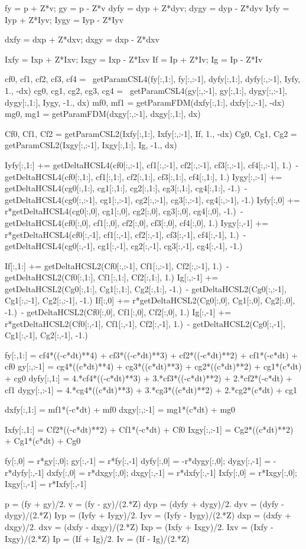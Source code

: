 \documentclass[dvipdfmx, 9pt, a4paper]{jsarticle}
\begin{document}
\begin{python}
	fy = p + Z*v; gy = p - Z*v
	dyfy = dyp + Z*dyv; dygy = dyp - Z*dyv
	Iyfy = Iyp + Z*Iyv; Iygy = Iyp - Z*Iyv

	dxfy = dxp + Z*dxv; dxgy = dxp - Z*dxv

	Ixfy = Ixp + Z*Ixv; Ixgy = Ixp - Z*Ixv
	If = Ip + Z*Iv; Ig = Ip - Z*Iv

	cf0, cf1, cf2, cf3, cf4 = \
	getParamCSL4(fy[:,1:], fy[:,:-1], dyfy[:,1:], dyfy[:,:-1], Iyfy, 1., -dx)
	cg0, cg1, cg2, cg3, cg4 = \
	getParamCSL4(gy[:,:-1], gy[:,1:], dygy[:,:-1], dygy[:,1:], Iygy, -1., dx)
	mf0, mf1 = getParamFDM(dxfy[:,1:], dxfy[:,:-1], -dx)
	mg0, mg1 = getParamFDM(dxgy[:,:-1], dxgy[:,1:], dx)

	Cf0, Cf1, Cf2 = getParamCSL2(Ixfy[:,1:], Ixfy[:,:-1], If, 1., -dx)
	Cg0, Cg1, Cg2 = getParamCSL2(Ixgy[:,:-1], Ixgy[:,1:], Ig, -1., dx)

	Iyfy[:,1:] += getDeltaHCSL4(cf0[:,:-1], cf1[:,:-1], cf2[:,:-1], cf3[:,:-1], cf4[:,:-1], 1.)\
	 - getDeltaHCSL4(cf0[:,1:], cf1[:,1:], cf2[:,1:], cf3[:,1:], cf4[:,1:], 1.)
	Iygy[:,:-1] += getDeltaHCSL4(cg0[:,1:], cg1[:,1:], cg2[:,1:], cg3[:,1:], cg4[:,1:], -1.)\
	 - getDeltaHCSL4(cg0[:,:-1], cg1[:,:-1], cg2[:,:-1], cg3[:,:-1], cg4[:,:-1], -1.)
	Iyfy[:,0] += r*getDeltaHCSL4(cg0[:,0], cg1[:,0], cg2[:,0], cg3[:,0], cg4[:,0], -1.)\
	 - getDeltaHCSL4(cf0[:,0], cf1[:,0], cf2[:,0], cf3[:,0], cf4[:,0], 1.)
	Iygy[:,-1] += r*getDeltaHCSL4(cf0[:,-1], cf1[:,-1], cf2[:,-1], cf3[:,-1], cf4[:,-1], 1.)\
	 - getDeltaHCSL4(cg0[:,-1], cg1[:,-1], cg2[:,-1], cg3[:,-1], cg4[:,-1], -1.)

	If[:,1:] += getDeltaHCSL2(Cf0[:,:-1], Cf1[:,:-1], Cf2[:,:-1], 1.)\
	 - getDeltaHCSL2(Cf0[:,1:], Cf1[:,1:], Cf2[:,1:], 1.)
	Ig[:,:-1] += getDeltaHCSL2(Cg0[:,1:], Cg1[:,1:], Cg2[:,1:], -1.)\
	 - getDeltaHCSL2(Cg0[:,:-1], Cg1[:,:-1], Cg2[:,:-1], -1.)
	If[:,0] += r*getDeltaHCSL2(Cg0[:,0], Cg1[:,0], Cg2[:,0], -1.)\
	 - getDeltaHCSL2(Cf0[:,0], Cf1[:,0], Cf2[:,0], 1.)
	Ig[:,-1] += r*getDeltaHCSL2(Cf0[:,-1], Cf1[:,-1], Cf2[:,-1], 1.)\
	 - getDeltaHCSL2(Cg0[:,-1], Cg1[:,-1], Cg2[:,-1], -1.)

	fy[:,1:] = cf4*((-c*dt)**4) + cf3*((-c*dt)**3) + cf2*((-c*dt)**2) + cf1*(-c*dt) + cf0
	gy[:,:-1] = cg4*((c*dt)**4) + cg3*((c*dt)**3) + cg2*((c*dt)**2) + cg1*(c*dt) + cg0
	dyfy[:,1:] = 4.*cf4*((-c*dt)**3) + 3.*cf3*((-c*dt)**2) + 2.*cf2*(-c*dt) + cf1
	dygy[:,:-1] = 4.*cg4*((c*dt)**3) + 3.*cg3*((c*dt)**2) + 2.*cg2*(c*dt) + cg1

	dxfy[:,1:] = mf1*(-c*dt) + mf0
	dxgy[:,:-1] = mg1*(c*dt) + mg0

	Ixfy[:,1:] = Cf2*((-c*dt)**2) + Cf1*(-c*dt) + Cf0
	Ixgy[:,:-1] = Cg2*((c*dt)**2) + Cg1*(c*dt) + Cg0

	fy[:,0] = r*gy[:,0]; gy[:,-1] = r*fy[:,-1]
	dyfy[:,0] = -r*dygy[:,0]; dygy[:,-1] = -r*dyfy[:,-1]
	dxfy[:,0] = r*dxgy[:,0]; dxgy[:,-1] = r*dxfy[:,-1]
	Ixfy[:,0] = r*Ixgy[:,0]; Ixgy[:,-1] = r*Ixfy[:,-1]

	p = (fy + gy)/2.
	v = (fy - gy)/(2.*Z)
	dyp = (dyfy + dygy)/2.
	dyv = (dyfy - dygy)/(2.*Z)
	Iyp = (Iyfy + Iygy)/2.
	Iyv = (Iyfy - Iygy)/(2.*Z)
	dxp = (dxfy + dxgy)/2.
	dxv = (dxfy - dxgy)/(2.*Z)
	Ixp = (Ixfy + Ixgy)/2.
	Ixv = (Ixfy - Ixgy)/(2.*Z)
	Ip = (If + Ig)/2.
	Iv = (If - Ig)/(2.*Z)
\end{python}
\end{document}
